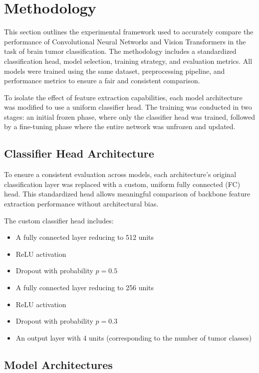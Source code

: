 \documentclass[11pt]{article}
\begin{document}
\section{Methodology}
This section outlines the experimental framework used to accurately compare the performance of Convolutional Neural Networks and Vision Transformers in the task of brain tumor classification. The methodology includes a standardized classification head, model selection, training strategy, and evaluation metrics. All models were trained using the same dataset, preprocessing pipeline, and performance metrics to ensure a fair and consistent comparison.

To isolate the effect of feature extraction capabilities, each model architecture was modified to use a uniform classifier head. The training was conducted in two stages: an initial frozen phase, where only the classifier head was trained, followed by a fine-tuning phase where the entire network was unfrozen and updated. 

\subsection*{Classifier Head Architecture}

To ensure a consistent evaluation across models, each architecture’s original classification layer was replaced with a custom, uniform fully connected (FC) head. This standardized head allows meaningful comparison of backbone feature extraction performance without architectural bias.

The custom classifier head includes:
\begin{itemize}
\item A fully connected layer reducing to 512 units
\item ReLU activation
\item Dropout with probability $p = 0.5$
\item A fully connected layer reducing to 256 units
\item ReLU activation
\item Dropout with probability $p = 0.3$
\item An output layer with 4 units (corresponding to the number of tumor classes)
\end{itemize}


\subsection*{Model Architectures}
\end{document}
